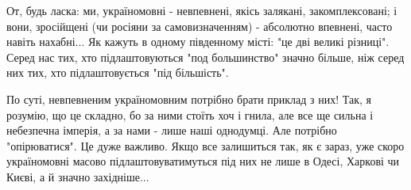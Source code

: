 От, будь ласка: ми, україномовні - невпевнені, якісь залякані, закомплексовані;
і вони, зросійщені (чи росіяни за самовизначенням) - абсолютно впевнені, часто
навіть нахабні... Як кажуть в одному південному місті: "це дві великі різниці".
Серед нас тих, хто підлаштовуються "под большинство" значно більше, ніж серед
них тих, хто підлаштовується "під більшість".

По суті, невпевненим україномовним потрібно брати приклад з них! Так, я
розумію, що це складно, бо за ними стоїть хоч і гнила, але все ще сильна і
небезпечна імперія, а за нами - лише наші однодумці. Але потрібно
"опірюватися". Це дуже важливо. Якщо все залишиться так, як є зараз, уже скоро
україномовні масово підлаштовуватимуться під них не лише в Одесі, Харкові чи
Києві, а й значно західніше...


